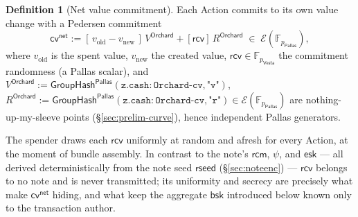 \documentclass[11pt,a4paper]{article}
\theoremstyle{definition}
\newtheorem{definition}[theorem]{Definition}
\newcommand{\F}{\mathbb{F}}
\newcommand{\cvsym}{\mathsf{cv}}
\newcommand{\Pallas}{\ensuremath{\mathsf{Pallas}}}
\newcommand{\Vesta}{\ensuremath{\mathsf{Vesta}}}
\newcommand{\Ep}{\ensuremath{\mathcal{E}}}
\newcommand{\GroupHash}{\ensuremath{\mathsf{GroupHash}}}
\newcommand{\rcv}{\ensuremath{\mathsf{rcv}}}
\newcommand{\rcm}{\ensuremath{\mathsf{rcm}}}
\begin{document}
\begin{definition}[Net value commitment]\label{def:cv}
Each Action commits to its own value change with a Pedersen commitment
\[
\cvsym^{\mathsf{net}} := [\,v_{\mathrm{old}} - v_{\mathrm{new}}\,]\,V^{\mathsf{Orchard}} + [\rcv]\,R^{\mathsf{Orchard}} \;\in\; \Ep(\F_{p_{\Pallas}}),
\]
where $v_{\mathrm{old}}$ is the spent value, $v_{\mathrm{new}}$ the created
value, $\rcv \in \F_{p_{\Vesta}}$ the commitment randomness (a Pallas
scalar), and
$V^{\mathsf{Orchard}} := \GroupHash^{\Pallas}(\mathtt{z.cash:Orchard\text{-}cv}, \texttt{"v"})$,
$R^{\mathsf{Orchard}} := \GroupHash^{\Pallas}(\mathtt{z.cash:Orchard\text{-}cv}, \texttt{"r"})
\in \Ep(\F_{p_{\Pallas}})$ are nothing-up-my-sleeve points
(\S\ref{sec:prelim-curve}), hence independent Pallas generators.
\end{definition}

The spender draws each $\rcv$ uniformly at random and afresh for every Action,
at the moment of bundle assembly. In contrast to the note's $\rcm$, $\psi$, and
$\mathsf{esk}$ --- all derived deterministically from the note seed
$\mathsf{rseed}$ (\S\ref{sec:noteenc}) --- $\rcv$ belongs to no note and is never
transmitted; its uniformity and secrecy are precisely what make
$\cvsym^{\mathsf{net}}$ hiding, and what keep the aggregate $\mathsf{bsk}$
introduced below known only to the transaction author.
\end{document}
